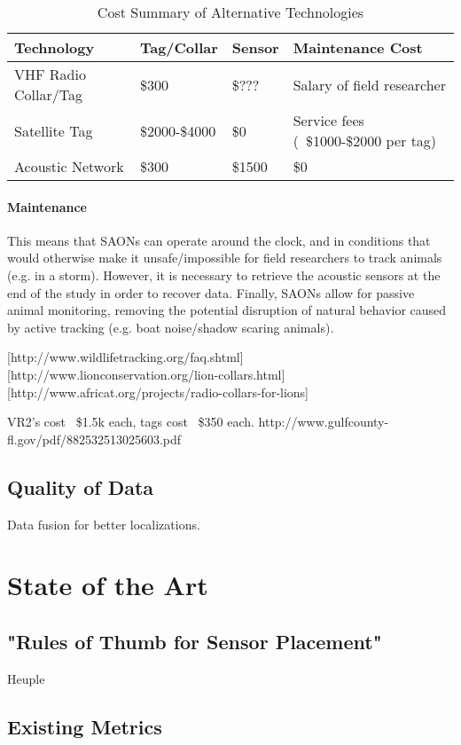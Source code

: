\begin{table}[h!]
		\caption{Cost Summary of Alternative Technologies}
		\label{tab:table1}
		\begin{tabular}{l l l l}
Technology&Tag/Collar&Sensor&Maintenance Cost\\
\hline
			VHF Radio Collar/Tag & \$300          & \$???  & Salary of field researcher\\
			Satellite Tag 	     & \$2000-\$4000  & \$0    & Service fees (~\$1000-\$2000 per tag)\\
			Acoustic Network 	 & \$300          & \$1500 & \$0\\
		\end{tabular}
\end{table}

\paragraph{Maintenance}
  This means that SAONs can operate around the clock, and in conditions that would otherwise make it unsafe/impossible for field researchers to track animals (e.g. in a storm).  However, it is necessary to retrieve the acoustic sensors at the end of the study in order to recover data.  Finally, SAONs allow for passive animal monitoring, removing the potential disruption of natural behavior caused by active tracking (e.g. boat noise/shadow scaring animals).  
  
  
[http://www.wildlifetracking.org/faq.shtml]
[http://www.lionconservation.org/lion-collars.html]
[http://www.africat.org/projects/radio-collars-for-lions]

VR2's cost ~\$1.5k each, tags cost ~\$350 each.  http://www.gulfcounty-fl.gov/pdf/882532513025603.pdf 

\subsection{Quality of Data}
Data fusion for better localizations.

\section{State of the Art}


\subsection{"Rules of Thumb for Sensor Placement"}
Heuple 

\subsection{Existing Metrics}
